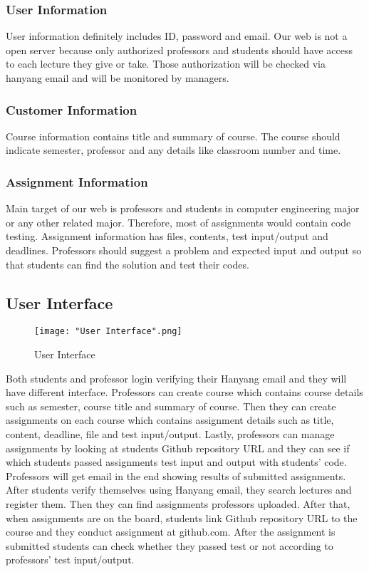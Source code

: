 \documentclass[10pt,journal,compsoc]{IEEEtran}
\begin{document}
\subsubsection{User Information}
User information definitely includes ID, password and email. Our web is not a open server because only authorized professors and students should have access to each lecture they give or take. Those authorization will be checked via hanyang email and will be monitored by managers. 

\subsubsection{Customer Information} 
Course information contains title and summary of course. The course should indicate semester, professor and any details like classroom number and time. 

\subsubsection{Assignment Information}
Main target of our web is professors and students in computer engineering major or any other related major. Therefore, most of assignments would contain code testing. Assignment information has files, contents, test input/output and deadlines. Professors should suggest a problem and expected input and output so that students can find the solution and test their codes.

\subsection {User Interface\\}
\begin{figure}[H]
\centering
\texttt{[image: "User Interface".png]}
{\caption*{User Interface}}
\end{figure}

Both students and professor login verifying their Hanyang email and they will have different interface. Professors can create course which contains course details such as semester, course title and summary of course. Then they can create assignments on each course which contains assignment details such as title, content, deadline, file and test input/output. Lastly, professors can manage assignments by looking at students Github repository URL and they can see if which students passed assignments test input and output with students’ code. Professors will get email in the end showing results of submitted assignments. After students verify themselves using Hanyang email, they search lectures and register them. Then they can find assignments professors uploaded. After that, when assignments are on the board, students link Github repository URL to the course and they conduct assignment at github.com. After the assignment is submitted students can check whether they passed test or not according to professors’ test input/output.
\end{document}
